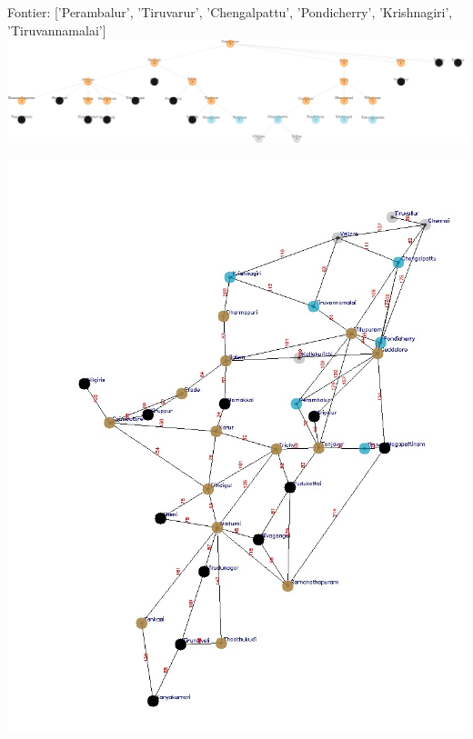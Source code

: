 \documentclass[xcolor=table]{beamer}
\begin{document}
\begin{frame}
  { \tiny Fontier: ['Perambalur', 'Tiruvarur', 'Chengalpattu', 'Pondicherry', 'Krishnagiri', 'Tiruvannamalai']}
  \includegraphics[width=1\textwidth]{../BFSNodes/38-1.png}
  \begin{center}
    \includegraphics[height=0.6\textheight]{../BFSoutput/tamilBFS36.jpg}
  \end{center}
\end{frame}
\end{document}
